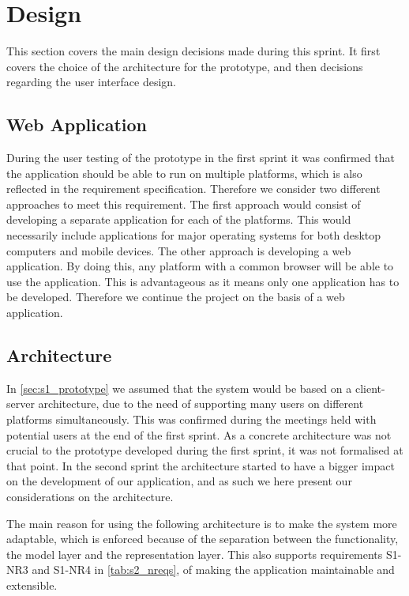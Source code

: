 \section{Design} \label{sec:s2_design}
This section covers the main design decisions made during this sprint. It first covers the choice of the architecture for the prototype, and then decisions regarding the user interface design.

\subsection{Web Application}
During the user testing of the prototype in the first sprint it was confirmed that the application should be able to run on multiple platforms, which is also reflected in the requirement specification. Therefore we consider two different approaches to meet this requirement. The first approach would consist of developing a separate application for each of the platforms. This would necessarily include applications for major operating systems for both desktop computers and mobile devices. The other approach is developing a web application. By doing this, any platform with a common browser will be able to use the application. This is advantageous as it means only one application has to be developed. Therefore we continue the project on the basis of a web application.

\subsection{Architecture} \label{sec:s2_architecture}
In \cref{sec:s1_prototype} we assumed that the system would be based on a client-server architecture, due to the need of supporting many users on different platforms simultaneously. This was confirmed during the meetings held with potential users at the end of the first sprint. As a concrete architecture was not crucial to the prototype developed during the first sprint, it was not formalised at that point. In the second sprint the architecture started to have a bigger impact on the development of our application, and as such we here present our considerations on the architecture.

The main reason for using the following architecture is to make the system more adaptable, which is enforced because of the separation between the functionality, the model layer and the representation layer. This also supports requirements S1-NR3 and S1-NR4 in \cref{tab:s2_nreqs}, of making the application maintainable and extensible.

